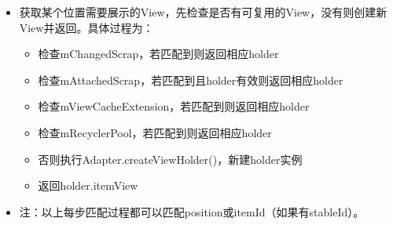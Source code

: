 \documentclass[9pt, b5paper]{article}
\begin{document}
\begin{itemize}
\item 获取某个位置需要展示的View，先检查是否有可复用的View，没有则创建新View并返回。具体过程为：
\begin{itemize}
\item 检查mChangedScrap，若匹配到则返回相应holder
\item 检查mAttachedScrap，若匹配到且holder有效则返回相应holder
\item 检查mViewCacheExtension，若匹配到则返回相应holder
\item 检查mRecyclerPool，若匹配到则返回相应holder
\item 否则执行Adapter.createViewHolder()，新建holder实例
\item 返回holder.itemView
\end{itemize}
\item 注：以上每步匹配过程都可以匹配position或itemId（如果有stableId）。
\end{itemize}
\end{document}
